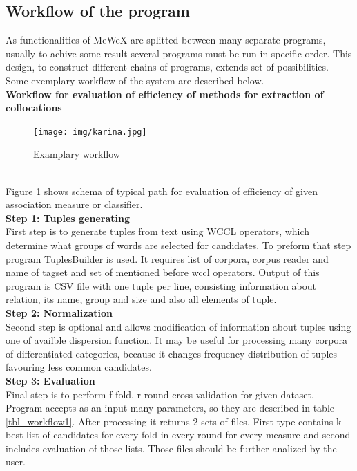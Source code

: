 \subsection{Workflow of the program} \label{mewex_workflow}
As functionalities of MeWeX are splitted between many separate programs, usually to achive some result several programs must be run in specific order. 
This design, to construct different chains of programs, extends set of possibilities. Some exemplary workflow of the system are described below. 
\\ \textbf{Workflow for evaluation of efficiency of methods for extraction of collocations}
\begin{figure}[ht]
	\centering
	\texttt{[image: img/karina.jpg]}
	\caption{Examplary workflow}
	\label{img_workflow1}
\end{figure}
\\ Figure \ref{img_workflow1} shows schema of typical path for evaluation of efficiency of given association measure or classifier.
\\ \textbf{Step 1: Tuples generating}\\
First step is to generate tuples from text using WCCL operators, which determine what groups of words are selected for candidates. 
To preform that step program TuplesBuilder is used. It requires list of corpora, corpus reader and name of tagset and 
set of mentioned before wccl operators. Output of this program is CSV file with one tuple per line, consisting information about relation, 
its name, group and size and also all elements of tuple.
\\ \textbf{Step 2: Normalization}\\
Second step is optional and allows modification of information about tuples using one of availble dispersion function. 
It may be useful for processing many corpora of differentiated categories, because it changes frequency distribution of tuples 
favouring less common candidates.
\\ \textbf{Step 3: Evaluation}\\
Final step is to perform f-fold, r-round cross-validation for given dataset. Program accepts as an input many parameters, 
so they are described in table \ref{tbl_workflow1}. After processing it returns 2 sets of files. First type contains k-best list 
of candidates for every fold in every round for every measure and second includes evaluation of those lists. 
Those files should be further analized by the user. 

